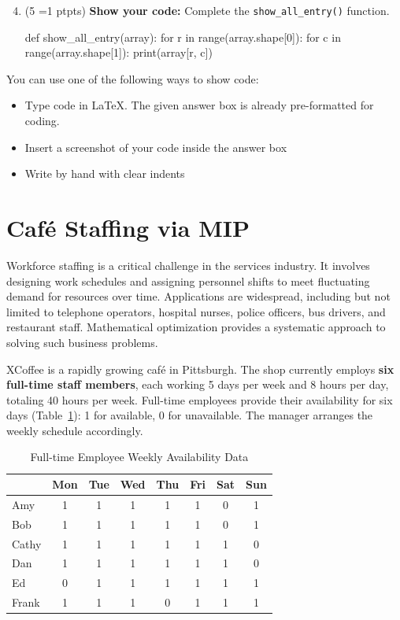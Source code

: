 \documentclass[11pt, letter, answers]{exam}
\newcommand{\pt}[1]{
    \small{(#1 \ifnum#1=1 pt\else pts\fi)}
    \normalsize
}
\newcommand{\sCode}{\textbf{Show your code: }}
\begin{document}
\begin{enumerate}
\setcounter{enumi}{3}
\item \pt{5} \sCode Complete the \texttt{show\_all\_entry()} function.

\begin{codeBox}[height=2in]
def show_all_entry(array):
    for r in range(array.shape[0]):
        for c in range(array.shape[1]):
            print(array[r, c])
\end{codeBox}
\end{enumerate}


You can use one of the following ways to show code:
\begin{itemize}
    \item Type code in \LaTeX. The given answer box is already pre-formatted for coding.
    \item Insert a screenshot of your code inside the answer box
    \item Write by hand with clear indents
\end{itemize}




\newpage
\section{Café Staffing via MIP}
\label{sec:a1_mip}

Workforce staffing is a critical challenge in the services industry. It involves designing work schedules and assigning personnel shifts to meet fluctuating demand for resources over time. Applications are widespread, including but not limited to telephone operators, hospital nurses, police officers, bus drivers, and restaurant staff. Mathematical optimization provides a systematic approach to solving such business problems.

XCoffee is a rapidly growing café in Pittsburgh. The shop currently employs \textbf{six full-time staff members}, each working 5 days per week and 8 hours per day, totaling 40 hours per week. Full-time employees provide their availability for six days (Table~\ref{tab:available}): 1 for available, 0 for unavailable. The manager arranges the weekly schedule accordingly.

\begin{table}[h!]
    \centering
    \begin{tabular}{lccccccc}
        \hline
         & Mon & Tue & Wed & Thu & Fri & Sat & Sun \\
        \hline
        Amy & 1 & 1 & 1 & 1 & 1 & 0 & 1 \\
        Bob & 1 & 1 & 1 & 1 & 1 & 0 & 1 \\
        Cathy & 1 & 1 & 1 & 1 & 1 & 1 & 0 \\
        Dan & 1 & 1 & 1 & 1 & 1 & 1 & 0 \\
        Ed & 0 & 1 & 1 & 1 & 1 & 1 & 1 \\
        Frank & 1 & 1 & 1 & 0 & 1 & 1 & 1 \\
        \hline
    \end{tabular}
    \caption{Full-time Employee Weekly Availability Data}
    \label{tab:available}
\end{table}
\end{document}
